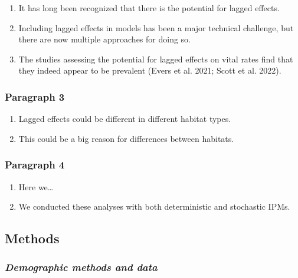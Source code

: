\documentclass[
  12pt,
]{article}
\providecommand{\tightlist}{%
  \setlength{\itemsep}{0pt}\setlength{\parskip}{0pt}}\usepackage{longtable,booktabs,array}
\begin{document}
\begin{enumerate}
\def\labelenumi{\arabic{enumi}.}
\tightlist
\item
  It has long been recognized that there is the potential for lagged
  effects.
\item
  Including lagged effects in models has been a major technical
  challenge, but there are now multiple approaches for doing so.
\item
  The studies assessing the potential for lagged effects on vital rates
  find that they indeed appear to be prevalent (Evers et al. 2021; Scott
  et al. 2022).
\end{enumerate}

\hypertarget{paragraph-3}{%
\subsubsection{\texorpdfstring{\textbf{Paragraph
3}}{Paragraph 3}}\label{paragraph-3}}

\begin{enumerate}
\def\labelenumi{\arabic{enumi}.}
\tightlist
\item
  Lagged effects could be different in different habitat types.
\item
  This could be a big reason for differences between habitats.
\end{enumerate}

\hypertarget{paragraph-4}{%
\subsubsection{\texorpdfstring{\textbf{Paragraph
4}}{Paragraph 4}}\label{paragraph-4}}

\begin{enumerate}
\def\labelenumi{\arabic{enumi}.}
\tightlist
\item
  Here we\ldots{}
\item
  We conducted these analyses with both deterministic and stochastic
  IPMs.
\end{enumerate}

\hypertarget{methods}{%
\subsection{Methods}\label{methods}}

\hypertarget{demographic-methods-and-data}{%
\subsubsection{\texorpdfstring{\emph{Demographic methods and
data}}{Demographic methods and data}}\label{demographic-methods-and-data}}
\end{document}
